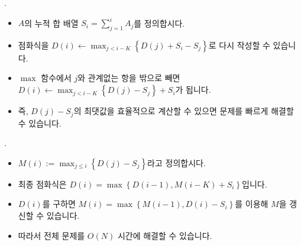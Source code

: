 \begin{frame}{\probno{}. \probtitle{}}
    \begin{itemize}
        \item $A$의 누적 합 배열 $\textstyle S_i = \sum_{j=1}^{i} A_j$를 정의합시다.
        \item 점화식을 $D(i) \leftarrow \max_{j < i-K} \left\{D(j) + S_i - S_j \right\}$로 다시 작성할 수 있습니다.
        \item $\max$ 함수에서 $j$와 관계없는 항을 밖으로 빼면 $D(i) \leftarrow \max_{j<i-K} \left\{ D(j) - S_j \right\} + S_i$가 됩니다.
        \item 즉, $D(j) - S_j$의 최댓값을 효율적으로 계산할 수 있으면 문제를 빠르게 해결할 수 있습니다.
    \end{itemize}
\end{frame}

\begin{frame}{\probno{}. \probtitle{}}
    \begin{itemize}
        \item $M(i) := \max_{j \le i} \left\{ D(j) - S_j \right\}$라고 정의합시다.
        \item 최종 점화식은 $D(i) = \max\left\{ D(i-1), M(i-K) + S_i \right\}$입니다.
        \item $D(i)$를 구하면 $M(i) = \max\left\{ M(i-1), D(i) - S_i \right\}$를 이용해 $M$을 갱신할 수 있습니다.
        \item 따라서 전체 문제를 $O(N)$ 시간에 해결할 수 있습니다.
    \end{itemize}
\end{frame}
